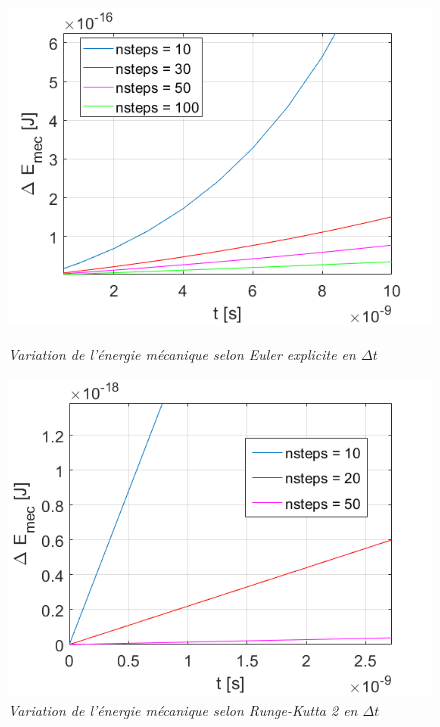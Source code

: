 \documentclass[a4paper,12pt,twoside]{article}
\begin{document}
		
	\begin{figure}[h]
		\begin{minipage}[c]{.46\linewidth}
			\centering
			\includegraphics[scale = 0.6]{D_E_mec_E.png}
			\caption{\em\label{Fig:Emec E} Variation de l'\'energie m\'ecanique selon Euler explicite en $\Delta t$}
		\end{minipage}
		\hfill%
		\begin{minipage}[c]{.46\linewidth}
			\centering
			\includegraphics[scale = 0.6]{D_E_mec_RK2.png}
			\caption{\em\label{Fig: Emec RK2} Variation de l'\'energie m\'ecanique selon Runge-Kutta 2 en $\Delta t$}
		\end{minipage}
	\end{figure}
\end{document}
